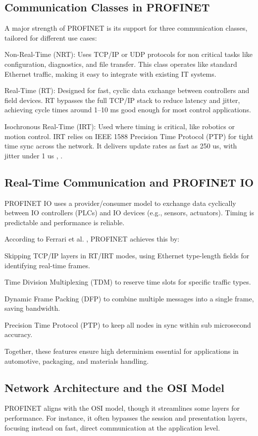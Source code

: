 \documentclass[conference]{IEEEtran}
\begin{document}
\subsection{Communication Classes in PROFINET} 
A major strength of PROFINET is its support for three communication classes, tailored for different use cases:

Non-Real-Time (NRT): Uses TCP/IP or UDP protocols for non critical tasks like configuration, diagnostics, and file transfer. This class operates like standard Ethernet traffic, making it easy to integrate with existing IT systems.

Real-Time (RT): Designed for fast, cyclic data exchange between controllers and field devices. RT bypasses the full TCP/IP stack to reduce latency and jitter, achieving cycle times around 1–10 ms good enough for most control applications.

Isochronous Real-Time (IRT): Used where timing is critical, like robotics or motion control. IRT relies on IEEE 1588 Precision Time Protocol (PTP) for tight time sync across the network. It delivers update rates as fast as 250 us, with jitter under 1 us \cite{ferrari2004profinet}, \cite{schumacher2008profinet}.

\subsection{Real-Time Communication and PROFINET IO} 
PROFINET IO uses a provider/consumer model to exchange data cyclically between IO controllers (PLCs) and IO devices (e.g., sensors, actuators). Timing is predictable and performance is reliable.

According to Ferrari et al. \cite{ferrari2004profinet}, PROFINET achieves this by:

Skipping TCP/IP layers in RT/IRT modes, using Ethernet type-length fields for identifying real-time frames.

Time Division Multiplexing (TDM) to reserve time slots for specific traffic types.

Dynamic Frame Packing (DFP) to combine multiple messages into a single frame, saving bandwidth.

Precision Time Protocol (PTP) to keep all nodes in sync within sub microsecond accuracy.

Together, these features ensure high determinism essential for applications in automotive, packaging, and materials handling.

\subsection{Network Architecture and the OSI Model} 
PROFINET aligns with the OSI model, though it streamlines some layers for performance. For instance, it often bypasses the session and presentation layers, focusing instead on fast, direct communication at the application level.
\end{document}
